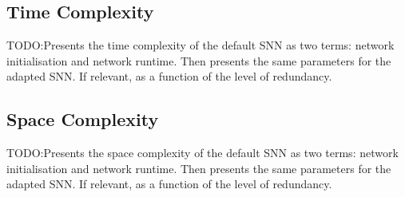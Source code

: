 \subsection{Time Complexity}\label{subsec:time_complexity}
TODO:Presents the time complexity of the default SNN as two terms: network initialisation and network runtime. Then presents the same parameters for the adapted SNN. If relevant, as a function of the level of redundancy.

\subsection{Space Complexity}\label{subsec:time_complexity}
TODO:Presents the space complexity of the default SNN as two terms: network initialisation and network runtime. Then presents the same parameters for the adapted SNN. If relevant, as a function of the level of redundancy.
